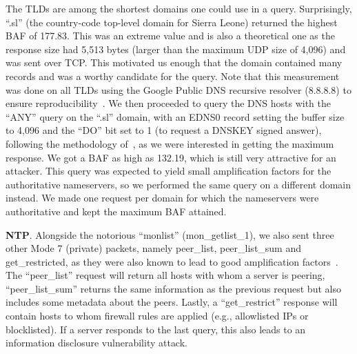  The TLDs are among the shortest domains one could use in a query. Surprisingly, ``.sl'' (the country-code top-level domain for Sierra Leone) returned the highest BAF of 177.83. This was an extreme value and is also a theoretical one as the response size had 5,513 bytes (larger than the maximum UDP size of 4,096) and was sent over TCP. This motivated us enough that the domain contained many records and was a worthy candidate for the query. Note that this measurement was done on all TLDs using the Google Public DNS recursive resolver (8.8.8.8) to ensure reproducibility~\cite{google_dns}. We then proceeded to query the DNS hosts with the ``ANY'' query on the ``.sl'' domain, with an EDNS0 record setting the buffer size to 4,096 and the ``DO'' bit set to 1 (to request a DNSKEY signed answer), following the methodology of~\cite{van_der_toorn_anyway_2021}, as we were interested in getting the maximum response. We got a BAF as high as 132.19, which is still very attractive for an attacker. This query was expected to yield small amplification factors for the authoritative nameservers, so we performed the same query on a different domain instead. We made one request per domain for which the nameservers were authoritative and kept the maximum BAF attained.
    
 \textbf{NTP}. Alongside the notorious ``monlist'' (mon\_getlist\_1), we also sent three other Mode 7 (private) packets, namely peer\_list, peer\_list\_sum and get\_restricted, as they were also known to lead to good amplification factors~\cite{rapid7_private}. The ``peer\_list'' request will return all hosts with whom a server is peering, ``peer\_list\_sum'' returns the same information as the previous request but also includes some metadata about the peers. Lastly, a ``get\_restrict'' response will contain hosts to whom firewall rules are applied (e.g., allowlisted IPs or blocklisted). If a server responds to the last query, this also leads to an information disclosure vulnerability attack. 
    
